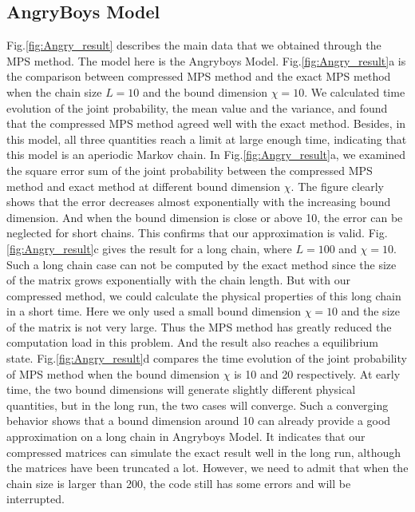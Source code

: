 \subsection{AngryBoys Model}
    Fig.\ref{fig:Angry_result} describes the main data that we obtained through the MPS method. The model here is the Angryboys Model. Fig.\ref{fig:Angry_result}a is the comparison between compressed MPS method and the exact MPS method when the chain size $L=10$ and the bound dimension $\chi=10$. We calculated time evolution of the joint probability, the mean value and the variance, and found that the compressed MPS method agreed well with the exact method. Besides, in this model, all three quantities reach a limit at large enough time, indicating that this model is an aperiodic Markov chain. In Fig.\ref{fig:Angry_result}a, we examined the square error sum of the joint probability between the compressed MPS method and exact method at different bound dimension $\chi$. The figure clearly shows that the error decreases almost exponentially with the increasing bound dimension. And when the bound dimension is close or above 10, the error can be neglected for short chains. This confirms that our approximation is valid. Fig.\ref{fig:Angry_result}c gives the result for a long chain, where $L=100$ and $\chi=10$. Such a long chain case can not be computed by the exact method since the size of the matrix grows exponentially with the chain length. But with our compressed method, we could calculate the physical properties of this long chain in a short time. Here we only used a small bound dimension $\chi=10$ and the size of the matrix is not very large. Thus the MPS method has greatly reduced the computation load in this problem. And the result also reaches a equilibrium state. Fig.\ref{fig:Angry_result}d compares the time evolution of the joint probability of MPS method when the bound dimension $\chi$ is 10 and 20 respectively. At early time, the two bound dimensions will generate slightly different physical quantities, but in the long run, the two cases will converge. Such a converging behavior shows that a bound dimension around 10 can already provide a good approximation on a long chain in Angryboys Model. It indicates that our compressed matrices can simulate the exact result well in the long run, although the matrices have been truncated a lot. However, we need to admit that when the chain size is larger than 200, the code still has some errors and will be interrupted.
    
